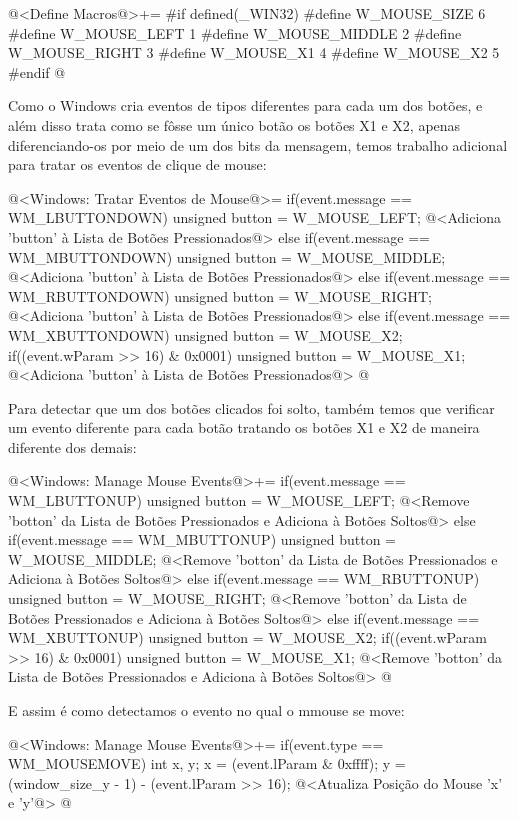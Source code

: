 \iniciocodigo
@<Define Macros@>+=
#if defined(_WIN32)
#define W_MOUSE_SIZE 6
#define W_MOUSE_LEFT   1
#define W_MOUSE_MIDDLE 2
#define W_MOUSE_RIGHT  3
#define W_MOUSE_X1     4
#define W_MOUSE_X2     5
#endif
@
\fimcodigo

Como o Windows cria eventos de tipos diferentes para cada um dos
botões, e além disso trata como se fôsse um único botão os botões X1 e
X2, apenas diferenciando-os por meio de um dos bits da mensagem, temos
trabalho adicional para tratar os eventos de clique de mouse:

\iniciocodigo
@<Windows: Tratar Eventos de Mouse@>=
if(event.message == WM_LBUTTONDOWN){
  unsigned button = W_MOUSE_LEFT;
  @<Adiciona 'button' à Lista de Botões Pressionados@>
}
else if(event.message == WM_MBUTTONDOWN){
  unsigned button = W_MOUSE_MIDDLE;
  @<Adiciona 'button' à Lista de Botões Pressionados@>
}
else if(event.message == WM_RBUTTONDOWN){
  unsigned button = W_MOUSE_RIGHT;
  @<Adiciona 'button' à Lista de Botões Pressionados@>
}
else if(event.message == WM_XBUTTONDOWN){
  unsigned button = W_MOUSE_X2;
  if((event.wParam >> 16) & 0x0001){
    unsigned button = W_MOUSE_X1;
  }
  @<Adiciona 'button' à Lista de Botões Pressionados@>
}
@
\fimcodigo

Para detectar que um dos botões clicados foi solto, também temos que
verificar um evento diferente para cada botão tratando os botões X1 e
X2 de maneira diferente dos demais:

\iniciocodigo
@<Windows: Manage Mouse Events@>+=
if(event.message == WM_LBUTTONUP){
  unsigned button = W_MOUSE_LEFT;
  @<Remove 'botton' da Lista de Botões Pressionados e Adiciona à Botões Soltos@>
}
else if(event.message == WM_MBUTTONUP){
  unsigned button = W_MOUSE_MIDDLE;
  @<Remove 'botton' da Lista de Botões Pressionados e Adiciona à Botões Soltos@>
}
else if(event.message == WM_RBUTTONUP){
  unsigned button = W_MOUSE_RIGHT;
  @<Remove 'botton' da Lista de Botões Pressionados e Adiciona à Botões Soltos@>
}
else if(event.message == WM_XBUTTONUP){
  unsigned button = W_MOUSE_X2;
  if((event.wParam >> 16) & 0x0001){
    unsigned button = W_MOUSE_X1;
  }
  @<Remove 'botton' da Lista de Botões Pressionados e Adiciona à Botões Soltos@>
}
@
\fimcodigo

E assim é como detectamos o evento no qual o mmouse se move:

\iniciocodigo
@<Windows: Manage Mouse Events@>+=
if(event.type == WM_MOUSEMOVE){
  int x, y;
  x = (event.lParam & 0xffff);
  y = (window_size_y - 1) - (event.lParam >> 16);
  @<Atualiza Posição do Mouse 'x' e 'y'@>
}
@
\fimcodigo

